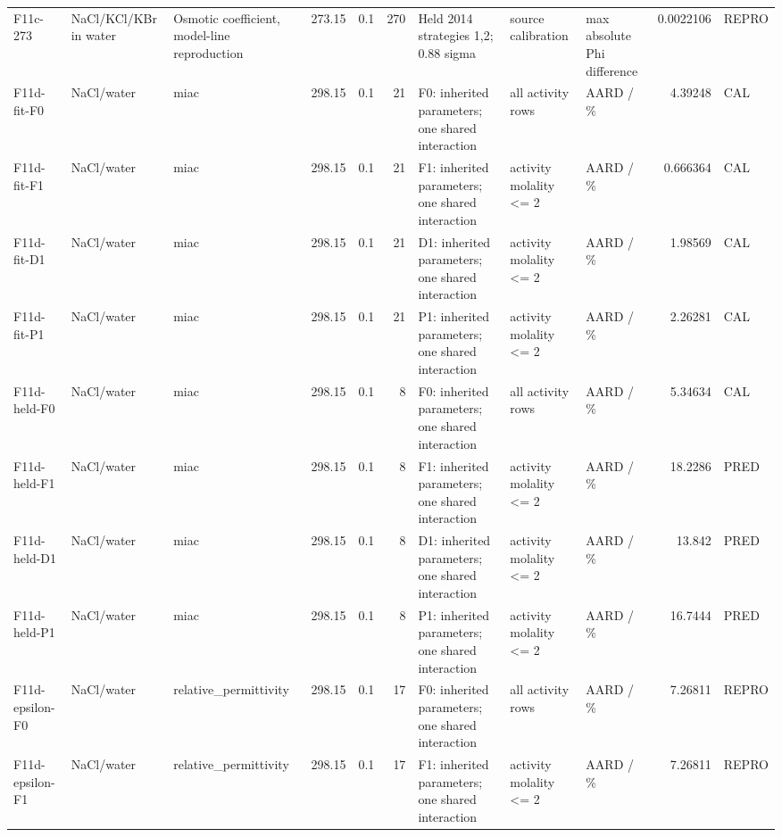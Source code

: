 \begin{landscape}
\begin{longtable}{L{1.9cm}L{2.5cm}L{2.1cm}L{1.6cm}L{1.6cm}rL{2.4cm}L{1.9cm}L{2.2cm}rL{1cm}}
F11c-\allowbreak{}273 & NaCl/\allowbreak{}KCl/\allowbreak{}KBr in water & Osmotic coefficient, model-\allowbreak{}line reproduction & 273.15 & 0.1 & 270 & Held 2014 strategies 1,2; 0.88 sigma & source calibration & max absolute Phi difference & 0.0022106 & REPRO \\
F11d-\allowbreak{}fit-\allowbreak{}F0 & NaCl/\allowbreak{}water & miac & 298.15 & 0.1 & 21 & F0: inherited parameters; one shared interaction & all activity rows & AARD /\allowbreak{} \% & 4.39248 & CAL \\
F11d-\allowbreak{}fit-\allowbreak{}F1 & NaCl/\allowbreak{}water & miac & 298.15 & 0.1 & 21 & F1: inherited parameters; one shared interaction & activity molality <= 2 & AARD /\allowbreak{} \% & 0.666364 & CAL \\
F11d-\allowbreak{}fit-\allowbreak{}D1 & NaCl/\allowbreak{}water & miac & 298.15 & 0.1 & 21 & D1: inherited parameters; one shared interaction & activity molality <= 2 & AARD /\allowbreak{} \% & 1.98569 & CAL \\
F11d-\allowbreak{}fit-\allowbreak{}P1 & NaCl/\allowbreak{}water & miac & 298.15 & 0.1 & 21 & P1: inherited parameters; one shared interaction & activity molality <= 2 & AARD /\allowbreak{} \% & 2.26281 & CAL \\
F11d-\allowbreak{}held-\allowbreak{}F0 & NaCl/\allowbreak{}water & miac & 298.15 & 0.1 & 8 & F0: inherited parameters; one shared interaction & all activity rows & AARD /\allowbreak{} \% & 5.34634 & CAL \\
F11d-\allowbreak{}held-\allowbreak{}F1 & NaCl/\allowbreak{}water & miac & 298.15 & 0.1 & 8 & F1: inherited parameters; one shared interaction & activity molality <= 2 & AARD /\allowbreak{} \% & 18.2286 & PRED \\
F11d-\allowbreak{}held-\allowbreak{}D1 & NaCl/\allowbreak{}water & miac & 298.15 & 0.1 & 8 & D1: inherited parameters; one shared interaction & activity molality <= 2 & AARD /\allowbreak{} \% & 13.842 & PRED \\
F11d-\allowbreak{}held-\allowbreak{}P1 & NaCl/\allowbreak{}water & miac & 298.15 & 0.1 & 8 & P1: inherited parameters; one shared interaction & activity molality <= 2 & AARD /\allowbreak{} \% & 16.7444 & PRED \\
F11d-\allowbreak{}epsilon-\allowbreak{}F0 & NaCl/\allowbreak{}water & relative\_\allowbreak{}permittivity & 298.15 & 0.1 & 17 & F0: inherited parameters; one shared interaction & all activity rows & AARD /\allowbreak{} \% & 7.26811 & REPRO \\
F11d-\allowbreak{}epsilon-\allowbreak{}F1 & NaCl/\allowbreak{}water & relative\_\allowbreak{}permittivity & 298.15 & 0.1 & 17 & F1: inherited parameters; one shared interaction & activity molality <= 2 & AARD /\allowbreak{} \% & 7.26811 & REPRO \\

\end{longtable}
\end{landscape}
